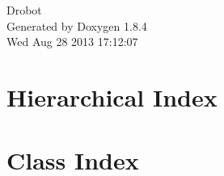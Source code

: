 \documentclass[twoside]{book}
\newcommand{\clearemptydoublepage}{%
  \newpage{\pagestyle{empty}\cleardoublepage}%
}
\begin{document}
\hypersetup{pageanchor=false}
\begin{titlepage}
\vspace*{7cm}
\begin{center}%
{\Large Drobot }\\
\vspace*{1cm}
{\large Generated by Doxygen 1.8.4}\\
\vspace*{0.5cm}
{\small Wed Aug 28 2013 17:12:07}\\
\end{center}
\end{titlepage}
\clearemptydoublepage
\tableofcontents
\clearemptydoublepage
{}
\hypersetup{pageanchor=true}

\chapter{Hierarchical Index}

\chapter{Class Index}

\end{document}
